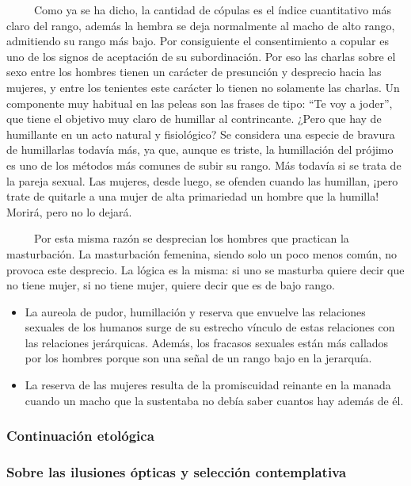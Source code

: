 ~ ~ ~ Como ya se ha dicho, la cantidad de cópulas es el índice
cuantitativo más claro del rango, además la hembra se deja normalmente
al macho de alto rango, admitiendo su rango más bajo. Por consiguiente
el consentimiento a copular es uno de los signos de aceptación de su
subordinación. Por eso las charlas sobre el sexo entre los hombres
tienen un carácter de presunción y desprecio hacia las mujeres, y entre
los tenientes este carácter lo tienen no solamente las charlas. Un
componente muy habitual en las peleas son las frases de tipo: ``Te voy a
joder'', que tiene el objetivo muy claro de humillar al contrincante.
¿Pero que hay de humillante en un acto natural y fisiológico? Se
considera una especie de bravura de humillarlas todavía más, ya que,
aunque es triste, la humillación del prójimo es uno de los métodos más
comunes de subir su rango. Más todavía si se trata de la pareja sexual.
Las mujeres, desde luego, se ofenden cuando las humillan, ¡pero trate de
quitarle a una mujer de alta primariedad un hombre que la humilla!
Morirá, pero no lo dejará.

~ ~ ~ Por esta misma razón se desprecian los hombres que practican la
masturbación. La masturbación femenina, siendo solo un poco menos común,
no provoca este desprecio. La lógica es la misma: si uno se masturba
quiere decir que no tiene mujer, si no tiene mujer, quiere decir que es
de bajo rango.

\begin{itemize}
\tightlist
\item
  La aureola de pudor, humillación y reserva que envuelve las relaciones
  sexuales de los humanos surge de su estrecho vínculo de estas
  relaciones con las relaciones jerárquicas. Además, los fracasos
  sexuales están más callados por los hombres porque son una señal de un
  rango bajo en la jerarquía.
\item
  La reserva de las mujeres resulta de la promiscuidad reinante en la
  manada cuando un macho que la sustentaba no debía saber cuantos hay
  además de él.
\end{itemize}

\hypertarget{continuaciuxf3n-etoluxf3gica}{\subsubsection{Continuación
etológica}\label{continuaciuxf3n-etoluxf3gica}}

\protect\hypertarget{M19B}{}{}

\hypertarget{sobre-las-ilusiones-uxf3pticas-y-selecciuxf3n-contemplativa}{\subsubsection{Sobre
las ilusiones ópticas y selección
contemplativa}\label{sobre-las-ilusiones-uxf3pticas-y-selecciuxf3n-contemplativa}}

